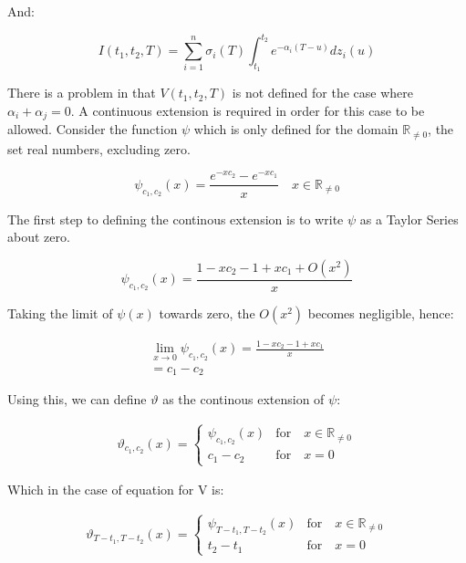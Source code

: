 \documentclass{article}
\begin{document}
And:

\begin{equation}
    I(t_1, t_2, T) = \sum_{i=1}^n \sigma_i(T) \int_{t_1}^{t_2} e^{-\alpha_i(T-u)}dz_i(u)
\end{equation}

\bigskip
There is a problem in that $V(t_1, t_2, T)$ is not defined for the case where 
$\alpha_i + \alpha_j = 0$. A continuous extension is required in order for this
case to be allowed. Consider the function $\psi$ which is only defined for 
the domain $\mathbb{R}_{\ne 0}$, the set real numbers, excluding zero.

\begin{equation}
    \psi_{c_1, c_2}(x) = \frac{e^{-x c_2} - e^{-x c_1}}{x} \quad  x \in \mathbb{R}_{\ne 0}
\end{equation}

The first step to defining the continous extension is to write $\psi$ as a Taylor Series
about zero.

\begin{equation}
    \psi_{c_1, c_2}(x) = \frac{1 - x c_2 - 1 + x c_1 + O(x^2)}{x}
\end{equation}

Taking the limit of $\psi(x)$ towards zero, the $O(x^2)$ becomes negligible, hence:

\begin{eqnarray}
    \nonumber
    \lim_{x \to 0} \psi_{c_1, c_2}(x) = \frac{1 - x c_2 - 1 + x c_1}{x} \\
    = c_1 - c_2
\end{eqnarray}

Using this, we can define $\vartheta$ as the continous extension of $\psi$:

\begin{align}
    \vartheta_{c_1, c_2}(x) = 
    \begin{cases}
        \psi_{c_1, c_2}(x) & \text{for} \quad x \in \mathbb{R}_{\ne 0} \\
        c_1 - c_2 & \text{for} \quad x=0
    \end{cases}
\end{align}

Which in the case of equation for V is:

\begin{align}
    \vartheta_{T-t_1, T-t_2}(x) = 
    \begin{cases}
        \psi_{T-t_1, T-t_2}(x) & \text{for} \quad x \in \mathbb{R}_{\ne 0} \\
        t_2 - t_1 & \text{for} \quad x=0
    \end{cases}
\end{align}
\end{document}
